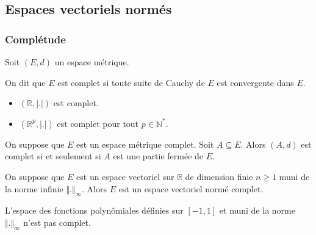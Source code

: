 




  \subsection{Espaces vectoriels normés}

  \subsubsection{Complétude}

  \label{206-1}


  Soit $(E, d)$ un espace métrique.

  \begin{definition}
    On dit que $E$ est complet si toute suite de Cauchy de $E$ est convergente dans $E$.
  \end{definition}

  \begin{example}
    \begin{itemize}
      \item $(\mathbb{R}, \vert . \vert)$ est complet.
      \item $(\mathbb{R}^p, \vert . \vert)$ est complet pour tout $p \in \mathbb{N}^*$.
    \end{itemize}
  \end{example}

  \begin{proposition}
    On suppose que $E$ est un espace métrique complet. Soit $A \subseteq E$. Alors $(A,d)$ est complet si et seulement si $A$ est une partie fermée de $E$.
  \end{proposition}

  \begin{proposition}
    On suppose que $E$ est un espace vectoriel sur $\mathbb{R}$ de dimension finie $n \geq 1$ muni de la norme infinie $\Vert . \Vert_\infty$. Alors $E$ est un espace vectoriel normé complet.
  \end{proposition}

  \begin{cexample}
    L'espace des fonctions polynômiales définies sur $[-1,1]$ et muni de la norme $\Vert . \Vert_{\infty}$ n'est pas complet.
  \end{cexample}


